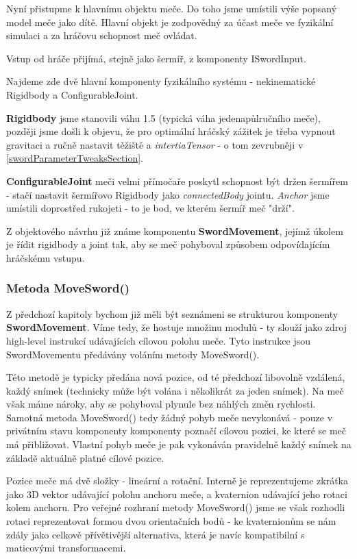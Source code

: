 Nyní přistupme k hlavnímu objektu meče. Do toho jsme umístili výše popsaný model meče jako dítě. Hlavní objekt je zodpovědný za účast meče ve fyzikální simulaci a za hráčovu schopnost meč ovládat.

Vstup od hráče přijímá, stejně jako šermíř, z komponenty ISwordInput.

Najdeme zde dvě hlavní komponenty fyzikálního systému - nekinematické Rigidbody a ConfigurableJoint.

\textbf{Rigidbody} jsme stanovili váhu 1.5 (typická váha jedenapůlručního meče), později jsme došli k objevu, že pro optimální hráčský zážitek je třeba vypnout gravitaci a ručně nastavit těžiště a \textit{intertiaTensor} - o tom zevrubněji v \ref{swordParameterTweaksSection}.

\textbf{ConfigurableJoint} meči velmi přímočaře poskytl schopnost být držen šermířem - stačí nastavit šermířovo Rigidbody jako \textit{connectedBody} jointu. \textit{Anchor} jsme umístili doprostřed rukojeti - to je bod, ve kterém šermíř meč "drží". 

Z objektového návrhu již známe komponentu \textbf{SwordMovement}, jejímž úkolem je řídit rigidbody a joint tak, aby se meč pohyboval způsobem odpovídajícím hráčskému vstupu.


\subsubsection*{Metoda MoveSword()} \label{swordMovementMoveSwordImplementationSubsection}

Z předchozí kapitoly bychom již měli být seznámeni se strukturou komponenty \textbf{SwordMovement}. Víme tedy, že hostuje množinu modulů - ty slouží jako zdroj high-level instrukcí udávajících cílovou polohu meče. Tyto instrukce jsou SwordMovementu předávány voláním metody MoveSword().

Této metodě je typicky předána nová pozice, od té předchozí libovolně vzdálená, každý snímek (technicky může být volána i několikrát za jeden snímek). Na meč však máme nároky, aby se pohyboval plynule bez náhlých změn rychlosti. Samotná metoda MoveSword() tedy žádný pohyb meče nevykonává - pouze v privátním stavu komponenty komponenty poznačí cílovou pozici, ke které se meč má přibližovat. Vlastní pohyb meče je pak vykonáván pravidelně každý snímek na základě aktuálně platné cílové pozice.

Pozice meče má dvě složky - lineární a rotační. Interně je reprezentujeme zkrátka jako 3D vektor udávající polohu anchoru meče, a kvaternion udávající jeho rotaci kolem anchoru. Pro veřejné rozhraní metody MoveSword() jsme se však rozhodli rotaci reprezentovat formou dvou orientačních bodů - ke kvaternionům se nám zdály jako celkově přívětivější alternativa, která je navíc kompatibilní s maticovými transformacemi.


